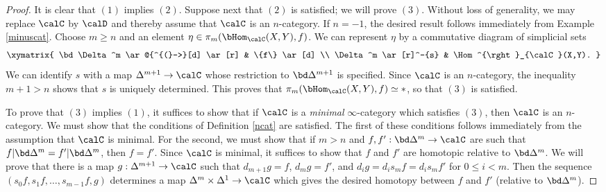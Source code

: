 \begin{proof}
It is clear that $(1)$ implies $(2)$. Suppose next that $(2)$ is satisfied; we will prove $(3)$. Without loss of generality, we may replace $\calC$ by $\calD$ and thereby assume that $\calC$ is an $n$-category. If $n=-1$, the desired result follows immediately from Example \ref{minuscat}.
Choose $m \geq n$ and an element $\eta \in \pi_m( \bHom_{\calC}(X,Y), f)$.
We can represent $\eta$ by a commutative diagram of simplicial sets
$$ \xymatrix{ \bd \Delta^m \ar@{^{(}->}[d] \ar[r] & \{f\} \ar[d] \\
\Delta^m \ar[r]^-{s} & \Hom^{\rght}_{\calC}(X,Y). }$$
We can identify $s$ with a map $\Delta^{m+1} \rightarrow \calC$ whose restriction to
$\bd \Delta^{m+1}$ is specified. Since $\calC$ is an $n$-category, the inequality
$m+1 > n$ shows that $s$ is uniquely determined. This proves that $\pi_m( \bHom_{\calC}(X,Y), f) \simeq \ast$, so that $(3)$ is satisfied.

To prove that $(3)$ implies $(1)$, it suffices to show that if $\calC$ is a {\em minimal} $\infty$-category which satisfies $(3)$, then $\calC$ is an $n$-category. We must show that the conditions of Definition \ref{ncat} are satisfied. The first of these conditions follows immediately from the assumption that $\calC$ is minimal. For the second, we must show that if $m > n$ and $f,f': \bd \Delta^m \rightarrow \calC$ are such that $f| \bd \Delta^m = f'| \bd \Delta^m$, then $f=f'$.
Since $\calC$ is minimal, it suffices to show that $f$ and $f'$ are homotopic relative
to $\bd \Delta^m$. We will prove that there is a map $g: \Delta^{m+1} \rightarrow \calC$
such that $d_{m+1} g = f$, $d_m g = f'$, and $d_i g = d_i s_m f = d_i s_m f'$ for $0 \leq i < m$.
Then the sequence $(s_0 f, s_1 f, \ldots, s_{m-1} f, g)$ determines a map
$\Delta^m \times \Delta^1 \rightarrow \calC$ which gives the desired homotopy between
$f$ and $f'$ (relative to $\bd \Delta^m$).


\end{proof}
